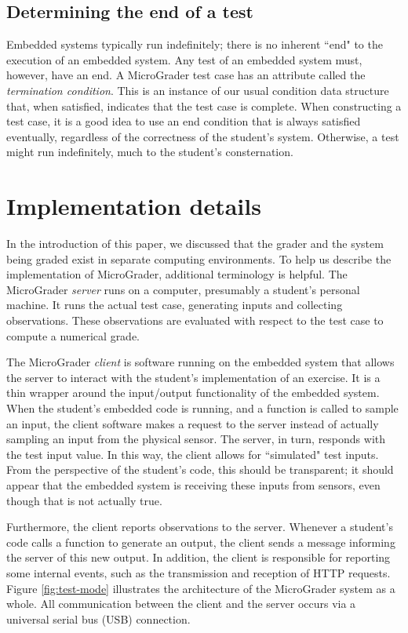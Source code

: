 \documentclass[12pt]{article}
\begin{document}
\subsection{Determining the end of a test}
Embedded systems typically run indefinitely; there is no inherent ``end" to the execution of an embedded system.  Any test of an embedded system must, however, have an end.  A MicroGrader test case has an attribute called the \textit{termination condition}.  This is an instance of our usual condition data structure that, when satisfied, indicates that the test case is complete.  When constructing a test case, it is a good idea to use an end condition that is always satisfied eventually, regardless of the correctness of the student's system.  Otherwise, a test might run indefinitely, much to the student's consternation.


\clearpage
\section{Implementation details}
In the introduction of this paper, we discussed that the grader and the system being graded exist in separate computing environments.  To help us describe the implementation of MicroGrader, additional terminology is helpful.  The MicroGrader \textit{server} runs on a computer, presumably a student's personal machine.  It runs the actual test case, generating inputs and collecting observations.  These observations are evaluated with respect to the test case to compute a numerical grade.

The MicroGrader \textit{client} is software running on the embedded system that allows the server to interact with the student's implementation of an exercise.  It is a thin wrapper around the input/output functionality of the embedded system.  When the student's embedded code is running, and a function is called to sample an input, the client software makes a request to the server instead of actually sampling an input from the physical sensor.  The server, in turn, responds with the test input value.  In this way, the client allows for 	``simulated" test inputs.  From the perspective of the student's code, this should be transparent; it should appear that the embedded system is receiving these inputs from sensors, even though that is not actually true.

Furthermore, the client reports observations to the server.  Whenever a student's code calls a function to generate an output, the client sends a message informing the server of this new output.  In addition, the client is responsible for reporting some internal events, such as the transmission and reception of HTTP requests.  Figure \ref{fig:test-mode} illustrates the architecture of the MicroGrader system as a whole.  All communication between the client and the server occurs via a universal serial bus (USB) connection.
\end{document}
